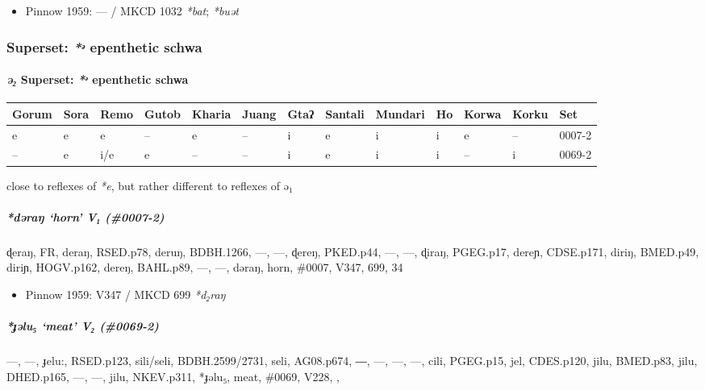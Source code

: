 \documentclass[a4paper,]{article}
\providecommand{\tightlist}{%
  \setlength{\itemsep}{0pt}\setlength{\parskip}{0pt}}
\let\oldparagraph\paragraph
\renewcommand{\paragraph}[1]{\oldparagraph{#1}\mbox{}}
\let\oldsubparagraph\subparagraph
\renewcommand{\subparagraph}[1]{\oldsubparagraph{#1}\mbox{}}
\begin{document}
\begin{itemize}
\tightlist
\item
  Pinnow 1959: --- / MKCD 1032 \emph{*bat}; \emph{*buət}
\end{itemize}

\subsubsection{\texorpdfstring{Superset: \emph{*ᵊ} epenthetic
schwa}{Superset: *ᵊ epenthetic schwa}}\label{superset-ux1d4a-epenthetic-schwa}

\paragraph{\texorpdfstring{\emph{ə₂} Superset: \emph{*ᵊ} epenthetic
schwa}{ə₂ Superset: *ᵊ epenthetic schwa}}\label{ux259-superset-ux1d4a-epenthetic-schwa}

\begin{longtable}[]{@{}lllllllllllll@{}}
\toprule
Gorum & Sora & Remo & Gutob & Kharia & Juang & Gtaʔ & Santali & Mundari
& Ho & Korwa & Korku & Set\tabularnewline
\midrule
\endhead
e & e & e & -- & e & -- & i & e & i & i & e & -- & 0007-2\tabularnewline
-- & e & i/e & e & -- & -- & i & e & i & i & -- & i &
0069-2\tabularnewline
\bottomrule
\end{longtable}

close to reflexes of \emph{*e}, but rather different to reflexes of ə₁

\subparagraph{\texorpdfstring{\emph{*dəraŋ} `horn' V₁
(\#0007-2)}{*dəraŋ horn V₁ (\#0007-2)}}\label{dux259raux14b-horn-v-0007-2}

ɖeraŋ, FR, deraŋ, RSED.p78, deruŋ, BDBH.1266, ---, ---, ɖereŋ, PKED.p44,
---, ---, ɖiraŋ, PGEG.p17, dereɲ, CDSE.p171, diriŋ, BMED.p49, diriɲ,
HOGV.p162, dereŋ, BAHL.p89, ---, ---, dəraŋ, horn, \#0007, V347, 699, 34

\begin{itemize}
\tightlist
\item
  Pinnow 1959: V347 / MKCD 699 \emph{*d₂raŋ}
\end{itemize}

\subparagraph{\texorpdfstring{\emph{*ɟəlu₅} `meat' V₂
(\#0069-2)}{*ɟəlu₅ meat V₂ (\#0069-2)}}\label{ux25fux259lu-meat-v-0069-2}

---, ---, ɟelu:, RSED.p123, sili/seli, BDBH.2599/2731, seli, AG08.p674,
―, ---, ---, ---, cili, PGEG.p15, jel, CDES.p120, jilu, BMED.p83, jilu,
DHED.p165, ---, ---, jilu, NKEV.p311, *ɟəlu₅, meat, \#0069, V228, ,
\end{document}
